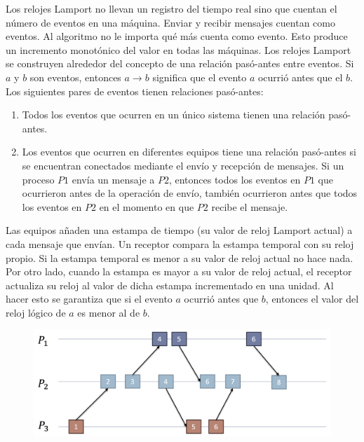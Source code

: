 \documentclass[12pt]{article}
\begin{document}
Los relojes Lamport no llevan un registro del tiempo real sino que cuentan el número de eventos en una máquina. 
Enviar y recibir mensajes cuentan como eventos.
Al algoritmo no le importa qué más cuenta como evento.
Esto produce un incremento monotónico del valor en todas las máquinas.
Los relojes Lamport se construyen alrededor del concepto de una relación pasó-antes entre eventos.
Si $a$ y $b$ son eventos, 
entonces $a \to b$ significa que el evento $a$ ocurrió antes que el $b$.
Los siguientes pares de eventos tienen relaciones pasó-antes:

\begin{enumerate}
   \item Todos los eventos que ocurren en un único sistema tienen una relación pasó-antes.

   \item Los eventos que ocurren en diferentes equipos tiene una relación pasó-antes si se encuentran conectados mediante el envío y recepción de mensajes.
   Si un proceso $P1$ envía un mensaje a $P2$, 
   entonces todos los eventos en $P1$ que ocurrieron antes de la operación de envío, 
   también ocurrieron antes que todos los eventos en $P2$ en el momento en que $P2$ recibe el mensaje.
\end{enumerate}

Las equipos añaden una estampa de tiempo (su valor de reloj Lamport actual) a cada mensaje que envían. 
Un receptor compara la estampa temporal con su reloj propio.
Si la estampa temporal es menor a su valor de reloj actual no hace nada.
Por otro lado, 
cuando la estampa es mayor a su valor de reloj actual,
el receptor actualiza su reloj al valor de dicha estampa incrementado en una unidad.
Al hacer esto se garantiza que si el evento $a$ ocurrió antes que $b$,
entonces el valor del reloj lógico de $a$ es menor al de $b$.

\begin{figure}[h]
   \centering
   \includegraphics[scale=0.5]{Lamport_clocks.png}
\end{figure}
\end{document}
